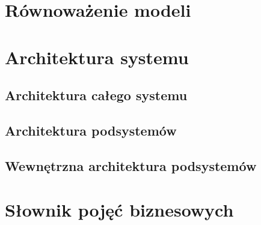 \documentclass[paper=a4, fontsize=12pt]{scrartcl}
\numberwithin{equation}{section}		%
\numberwithin{figure}{section}			%
\numberwithin{table}{section}				%
\begin{document}
\section{Równoważenie modeli}
	

\section{Architektura systemu}

	\subsection{Architektura całego systemu}
		
	\subsection{Architektura podsystemów}
		
	\subsection{Wewnętrzna architektura podsystemów}
		







\section{Słownik pojęć biznesowych}
	
\end{document}
